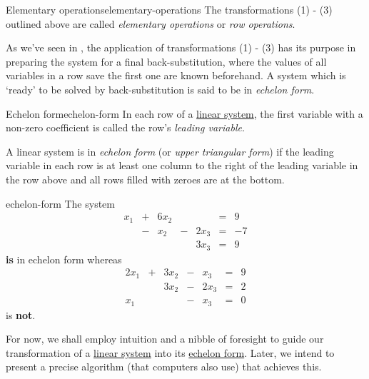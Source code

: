 \begin{definition}{Elementary operations}{elementary-operations}
 The transformations (1) - (3) outlined above are called \emph{elementary
 operations} or \emph{row operations}.
\end{definition}

As we've seen in , the application
of transformations (1) - (3) has its purpose in preparing the system for a final
back-substitution, where the values of all variables in a row save the first one
are known beforehand. A system which is `ready' to be solved by
back-substitution is said to be in \emph{echelon form}.

\begin{definition}{Echelon form}{echelon-form}
 In each row of a \hyperref[def:linear-system]{linear system}, the first
 variable with a non-zero coefficient is called the row's \emph{leading
 variable}.

 A linear system is in \emph{echelon form} (or \emph{upper triangular form}) if
 the leading variable in each row is at least one column to the right of the
 leading variable in the row above and all rows filled with zeroes are at the
 bottom.
\end{definition}

\begin{example}{}{echelon-form}
 The system
 \[
  \begin{array}{rcrcrcr}
   x_1 & + & 6x_2 & & & = & 9\\
    & - & x_2 & - & 2x_3 & = & -7\\
   & & & & 3x_3 & = & 9
  \end{array}
 \]
 \textbf{is} in echelon form whereas
 \[
  \begin{array}{rcrcrcr}
   2x_1 & + & 3x_2 & - & x_3 & = & 9\\
    & & 3x_2 & - & 2x_3 & = & 2\\
    x_1 & & & - & x_3 & = & 0
  \end{array}
 \]
 is \textbf{not}.
\end{example}

For now, we shall employ intuition and a nibble of foresight to guide our
transformation of a \hyperref[def:linear-system]{linear system} into its
\hyperref[def:echelon-form]{echelon form}. Later, we intend to present a precise
algorithm (that computers also use) that achieves this.

